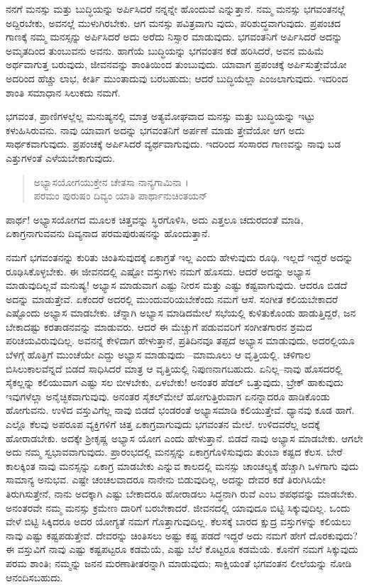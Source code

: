 ನನಗೆ ಮನಸ್ಸು ಮತ್ತು ಬುದ್ಧಿಯನ್ನು ಅರ್ಪಿಸಿದರೆ ನನ್ನನ್ನೇ ಹೊಂದುವೆ ಎನ್ನುತ್ತಾನೆ. ನಮ್ಮ ಮನಸ್ಸು ಭಗವಂತನಲ್ಲೆ ಅದ್ದಿರಬೇಕು, ಅವನಲ್ಲೆ ಮುಳುಗಿರಬೇಕು. ಆಗ ಮನಸ್ಸು ಪವಿತ್ರವಾಗು ವುದು, ಪರಿಶುದ್ಧವಾಗುವುದು. ಪ್ರಪಂಚದ ಗಾಣಕ್ಕೆ ನಮ್ಮ ಮನಸ್ಸನ್ನು ಅರ್ಪಿಸಿದರೆ ಅದು ಅರೆದು ನಿಸ್ಸಾರ ಮಾಡುವುದು. ಭಗವಂತನಿಗೆ ಅರ್ಪಿಸಿದರೆ ಅದನ್ನು ಅಮೃತದಿಂದ ತುಂಬುವನು ಅವನು. ಹಾಗೆಯೆ ಬುದ್ಧಿಯನ್ನು ಭಗವಂತನ ಕಡೆ ಹರಿಸಿದರೆ, ಅವನ ಮಹಿಮೆ ಅರ್ಥವಾಗುತ್ತ ಬರುವುದು, ಜೀವನವನ್ನು ಶಾಂತಿಯಿಂದ ತುಂಬುವುದು. ಯಾವಾಗ ಪ್ರಪಂಚಕ್ಕೆ ಅರ್ಪಿಸುತ್ತೇವೆಯೋ ಅದರಿಂದ ಹೆಚ್ಚು ಲಾಭ, ಕೀರ್ತಿ ಮುಂತಾದುವು ಬರಬಹುದು; ಆದರೆ ಬುದ್ಧಿಯೆಲ್ಲಾ ಎಂಜಲಾಗುವುದು. ಇದರಿಂದ ಶಾಂತಿ ಸಮಾಧಾನ ಸಿಲುಕದು ನಮಗೆ.

ಭಗವಂತ, ಪ್ರಾಣಿಗಳಲ್ಲೆಲ್ಲ ಮನುಷ್ಯನಲ್ಲಿ ಮಾತ್ರ ಅತ್ಯಮೋಘವಾದ ಮನಸ್ಸು ಮತ್ತು ಬುದ್ಧಿಯನ್ನು ಇಟ್ಟು ಕಳುಹಿಸಿರುವನು. ನಾವು ಯಾವಾಗ ಅದನ್ನು ಭಗವಂತನಿಗೆ ಅರ್ಪಣೆ ಮಾಡು ತ್ತೇವೆಯೋ ಆಗ ಅದು ಸಾರ್ಥಕವಾಗುವುದು. ಪ್ರಪಂಚಕ್ಕೆ ಅರ್ಪಿಸಿದರೆ ವ್ಯರ್ಥವಾಗುವುದು. ಇದರಿಂದ ಸಂಸಾರದ ಗಾಣವನ್ನು ನಾವು ಬಡ ಎತ್ತುಗಳಂತೆ ಎಳೆಯಬೇಕಾಗುವುದು.

\begin{verse}
ಅಭ್ಯಾಸಯೋಗಯುಕ್ತೇನ ಚೇತಸಾ ನಾನ್ಯಗಾಮಿನಾ ।\\ಪರಮಂ ಪುರುಷಂ ದಿವ್ಯಂ ಯಾತಿ ಪಾರ್ಥಾನುಚಿಂತಯನ್ 
\end{verse}

{\small ಪಾರ್ಥ! ಅಭ್ಯಾಸಯೋಗದ ಮೂಲಕ ಚಿತ್ತವನ್ನು ಸ್ಥಿರಗೊಳಿಸಿ, ಅದು ಎತ್ತಲೂ ಚದುರದಂತೆ ಮಾಡಿ, ಏಕಾಗ್ರನಾಗುವವನು ದಿವ್ಯನಾದ ಪರಮಪುರುಷನನ್ನು ಹೊಂದುತ್ತಾನೆ.}

ನಮಗೆ ಭಗವಂತನನ್ನು ಕುರಿತು ಚಿಂತಿಸುವುದಕ್ಕೆ ಏಕಾಗ್ರತೆ ಇಲ್ಲ ಎಂದು ಹೇಳುವುದು ರೂಢಿ. ಇಲ್ಲದೆ ಇದ್ದರೆ ಅದನ್ನು ರೂಢಿಸಿಕೊಳ್ಳಬೇಕು. ಈ ಜೀವನದಲ್ಲಿ ಎಷ್ಟೋ ವಸ್ತುಗಳು ನಮಗೆ ಹೊಸದು. ಆದರೆ ಅದನ್ನು ಅಭ್ಯಾಸ ಮಾಡುವುದಿಲ್ಲವೆ ಮನುಷ್ಯ! ಅಭ್ಯಾಸ ಮಾಡುವಾಗ ಎಷ್ಟು ನೀರಸ ಮತ್ತು ಎಷ್ಟು ಕಷ್ಟವಾಗುವುದು. ಆದರೂ ಬಿಡದೆ ಅದನ್ನು ಮಾಡುತ್ತೇವೆ. ಏಕೆಂದರೆ ಅದರಲ್ಲಿ ಮುಂದುವರಿಯಬೇಕೆಂದು ನಮಗೆ ಆಸೆ. ಸಂಗೀತ ಕಲಿಯಬೇಕಾದರೆ ಎಷ್ಟೊಂದು ಅಭ್ಯಾಸ ಮಾಡಬೇಕು. ಚೆನ್ನಾಗಿ ಅಭ್ಯಾಸ ಮಾಡಿದಮೇಲೆ ಸಭೆಯಲ್ಲಿ ಕುಳಿತುಕೊಂಡು ಹಾಡುತ್ತಿದ್ದರೆ, ಜನ ಬೇಕಾದಷ್ಟು ಕರತಾಡನವನ್ನು ಮಾಡುವರು. ಆದರೆ ಈ ಮೆಚ್ಚುಗೆ ಪಡುವವರಿಗೆ ಸಂಗೀತಗಾರನ ಶ್ರಮದ ಪರಿಚಯವಿರುವುದಿಲ್ಲ. ಅವನನ್ನೆ ಕೇಳಿದಾಗ ಹೇಳುತ್ತಾನೆ, ಪ್ರತಿದಿನವೂ ತಪ್ಪದೆ ಅಭ್ಯಾಸ ಮಾಡುವುದು, ಅದರಲ್ಲಿಯೂ ಬೆಳಗ್ಗೆ ಹೊತ್ತಿಗೆ ಮುಂಚೆಯೇ ಎದ್ದು ಅಭ್ಯಾಸ ಮಾಡುವುದು –ಮಾಮೂಲು ಆ ವೃತ್ತಿಯಲ್ಲಿ. ಚಳಿಗಾಲ ಬಿಸಿಲುಕಾಲವೆನ್ನದೆ ಬಿಡದೆ ಸಾಧಿಸಿದರೆ ಮಾತ್ರ ಆ ವೃತ್ತಿಯಲ್ಲಿ ನಿಪುಣನಾಗಬಹುದು. ಏನಿಲ್ಲ–ನಾವು ಹೊಸದರಲ್ಲಿ ಸೈಕಲ್ಲನ್ನು ಕಲಿಯುವಾಗ ಎಷ್ಟು ಸಲ ಬೀಳಬೇಕು, ಏಳಬೇಕು! ಅನಂತರ ಪೆಡಲ್ ಒತ್ತುವುದು, ಬ್ರೇಕ್ ಹಾಕುವುದು ಇವುಗಳೆಲ್ಲಾ ಅನೈಚ್ಛಿಕವಾಗುವುವು. ಅನಂತರ ಸೈಕಲ್​ಮೇಲೆ ಹೋಗುತ್ತಿರುವಾಗ ಏನನ್ನಾದರೂ ಹಾಡಿಕೊಂಡು ಹೋಗುವನು. ಉಳಿದ ವಸ್ತುವಿಗೆಲ್ಲ ನಾವು ಬಿಡದೆ ಭಂಡರಂತೆ ಅಭ್ಯಾಸಮಾಡಿ ಕಲಿಯುತ್ತೇವೆ. ಧ್ಯಾನವು ಕೂಡ ಹಾಗೆ. ಎಲ್ಲೊ ಕೆಲವು ಅಪರೂಪ ವ್ಯಕ್ತಿಗಳಿಗೆ ಚಿತ್ತ ಏಕಾಗ್ರವಾಗುವುದು ಭಗವಂತನ ಮೇಲೆ. ಉಳಿದವರೆಲ್ಲ ಅದಕ್ಕೆ ಹೋರಾಡಬೇಕು. ಅದಕ್ಕೇ ಶ್ರೀಕೃಷ್ಣ ಅಭ್ಯಾಸ ಯೋಗ ಎಂದು ಹೇಳುತ್ತಾನೆ. ಬಿಡದೆ ನಾವು ಅಭ್ಯಾಸ ಮಾಡಬೇಕು. ಆಗಲೇ ಅದು ನಮ್ಮ ಸ್ವಭಾವವಾಗುವುದು. ಪ್ರಾರಂಭದಲ್ಲಿ ಮನಸ್ಸನ್ನು ಏಕಾಗ್ರಗೊಳಿಸುವುದು ತುಂಬಾ ಕಷ್ಟದ ಕೆಲಸ. ಬೇರೆ ಕಾಲಕ್ಕಿಂತ ನಾವು ಮನಸ್ಸನ್ನು ಏಕಾಗ್ರ ಮಾಡಬೇಕು ಎನ್ನುವ ಕಾಲದಲ್ಲಿ ಮನಸ್ಸು ಚಾಂಚಲ್ಯಕ್ಕೆ ಹೆಚ್ಚಾಗಿ ಒಳಗಾಗು ವುದು ಸಾಮಾನ್ಯ ಅನುಭವ. ಎಷ್ಟೇ ಚಂಚಲವಾದರೂ ನಾನೇನು ಬಿಡುವುದಿಲ್ಲ, ಅದನ್ನು ದೇವರ ಕಡೆ ತಿರುಗಿಸಿಯೇ ತಿರುಗಿಸುತ್ತೇನೆ, ನಾನು ಅದಕ್ಕಾಗಿ ಎಷ್ಟು ಬೇಕಾದರೂ ಹೋರಾಡಲು ಸಿದ್ಧನಾಗಿ ರುವೆ ಎಂಬ ಶಪಥವನ್ನು ಮಾಡಬೇಕು. ಅನಂತರವೇ ನಮ್ಮ ಮನಸ್ಸು ಕ್ರಮೇಣ ದಾರಿಗೆ ಬರಬೇಕಾದರೆ. ಜೀವನದಲ್ಲಿ ಯಾವುದೂ ಬಿಟ್ಟಿ ಸಿಕ್ಕುವುದಿಲ್ಲ. ಒಂದು ವೇಳೆ ಬಿಟ್ಟಿ ಸಿಕ್ಕಿದರೂ ಅದರ ಯೋಗ್ಯತೆ ನಮಗೆ ಗೊತ್ತಾಗುವುದಿಲ್ಲ. ಕೆಲಸಕ್ಕೆ ಬಾರದ ಕ್ಷುದ್ರ ವಸ್ತುಗಳನ್ನು ಕಲಿಯಲು ನಾವು ಎಷ್ಟು ಕಷ್ಟಪಡುತ್ತೇವೆ. ದೇವರನ್ನು ಚಿಂತಿಸಲು ಅಷ್ಟು ಕಷ್ಟ ಪಡದೆ ಇದ್ದರೆ ಅದು ನಮಗೆ ಹೇಗೆ ದೊರಕುವುದು? ಈ ವಸ್ತುವಿಗೆ ನಾವು ಎಷ್ಟು ಕಷ್ಟಪಟ್ಟರೂ ಕಡಮೆಯೆ, ಎಷ್ಟು ಬೆಲೆ ಕೊಟ್ಟರೂ ಕಡಮೆಯೆ. ಕೊನೆಗೆ ನಮಗೆ ಸಿಕ್ಕುವುದು ಪರಮ ಶಾಂತಿ; ನಮ್ಮನ್ನು ಜನನ ಮರಣಾತೀತರನ್ನಾಗಿ ಮಾಡುವುದು; ಸಾಕ್ಷಿಯಂತೆ ಭಗವಂತನ ಲೀಲೆಯನ್ನು ನೋಡಿ ಆನಂದಿಸಬಹುದು.

